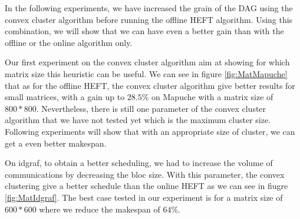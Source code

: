 \documentclass[10pt, conference, compsocconf,pdftex,dvipsnames]{IEEEtran}
\begin{document}
In the following experiments, we have increased the grain of the DAG using the
convex cluster algorithm before running the offline HEFT algorithm. Using this
combination, we will show that we can have even a better gain than with the
offline or the online algorithm only.

%                
%                
%

Our first experiment on the convex cluster algorithm aim at showing for which
matrix size this heuristic can be useful. We can see in figure
\ref{fig:MatMapuche} that as for the offline HEFT, the convex cluster
algorithm give better results for small matrices, with a gain up to $28.5\%$
on Mapuche with a matrix size of $800*800$. Nevertheless, there is still one
parameter of the convex cluster algorithm that we have not tested yet which is
the maximum cluster size. Following experiments will show that with an
appropriate size of cluster, we can get a even better makespan.

On idgraf, to obtain a better scheduling, we had to increase the volume of
communications by decreasing the bloc size. With this parameter, the convex
clustering give a better schedule than the online HEFT as we can see in fiugre
\ref{fig:MatIdgraf}.  The best case tested in our experiment is for a matrix
size of $600*600$ where we reduce the makespan of $64\%$.
\end{document}
